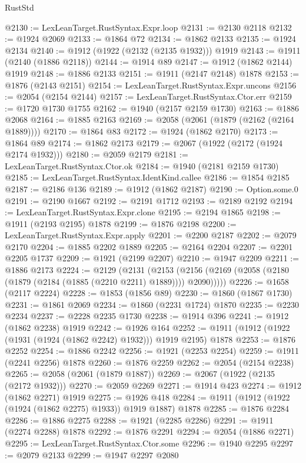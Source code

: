 \begin{lexlean}{RustStd}
\begin{coremodule}
@2130 := LexLeanTarget.RustSyntax.Expr.loop
@2131 := @2130 @2118
@2132 := @1924 @2069
@2133 := @1864 @72
@2134 := @1862 @2133
@2135 := @1924 @2134
@2140 := @1912 (@1922 (@2132 (@2135 @1932))) @1919
@2143 := @1911 (@2140 (@1886 @2118))
@2144 := @1914 @89
@2147 := @1912 (@1862 @2144) @1919
@2148 := @1886 @2133
@2151 := @1911 (@2147 @2148) @1878
@2153 := @1876 (@2143 @2151)
@2154 := LexLeanTarget.RustSyntax.Expr.uncons
@2156 := @2054 (@2154 @2144)
@2157 := LexLeanTarget.RustSyntax.Ctor.err
@2159 := @1720 @1730 @1755
@2162 := @1940 (@2157 @2159 @1730)
@2163 := @1886 @2068
@2164 := @1885 @2163
@2169 := @2058 (@2061 (@1879 (@2162 (@2164 @1889))))
@2170 := @1864 @83
@2172 := @1924 (@1862 @2170)
@2173 := @1864 @89
@2174 := @1862 @2173
@2179 := @2067 (@1922 (@2172 (@1924 @2174 @1932)))
@2180 := @2059 @2179
@2181 := LexLeanTarget.RustSyntax.Ctor.ok
@2184 := @1940 (@2181 @2159 @1730)
@2185 := LexLeanTarget.RustSyntax.IdentKind.callee
@2186 := @1854 @2185
@2187 := @2186 @136
@2189 := @1912 (@1862 @2187)
@2190 := Option.some.{0}
@2191 := @2190 @1667
@2192 := @2191 @1712
@2193 := @2189 @2192
@2194 := LexLeanTarget.RustSyntax.Expr.clone
@2195 := @2194 @1865
@2198 := @1911 (@2193 @2195) @1878
@2199 := @1876 @2198
@2200 := LexLeanTarget.RustSyntax.Expr.apply
@2201 := @2200 @2187
@2202 := @2079 @2170
@2204 := @1885 @2202 @1889
@2205 := @2164 @2204
@2207 := @2201 @2205 @1737
@2209 := @1921 (@2199 @2207)
@2210 := @1947 @2209
@2211 := @1886 @2173
@2224 := @2129
    (@2131
      (@2153 (@2156 (@2169 (@2058 (@2180 (@1879 (@2184 (@1885 (@2210 @2211) @1889)))) @2090)))))
@2226 := @1658 (@2117 @2224)
@2228 := @1853 (@1856 @89)
@2230 := @1860 (@1867 @1730)
@2231 := @1861 @2069
@2234 := @1860 (@2231 @1724) @1870
@2235 := @2230 @2234
@2237 := @2228 @2235 @1730
@2238 := @1914 @396
@2241 := @1912 (@1862 @2238) @1919
@2242 := @1926 @164
@2252 := @1911 (@1912 (@1922 (@1931 (@1924 (@1862 @2242) @1932))) @1919 @2195) @1878
@2253 := @1876 @2252
@2254 := @1886 @2242
@2256 := @1921 (@2253 @2254)
@2259 := @1911 (@2241 @2256) @1878
@2260 := @1876 @2259
@2262 := @2054 (@2154 @2238)
@2265 := @2058 (@2061 (@1879 @1887))
@2269 := @2067 (@1922 (@2135 (@2172 @1932)))
@2270 := @2059 @2269
@2271 := @1914 @423
@2274 := @1912 (@1862 @2271) @1919
@2275 := @1926 @418
@2284 := @1911 (@1912 (@1922 (@1924 (@1862 @2275) @1933)) @1919 @1887) @1878
@2285 := @1876 @2284
@2286 := @1886 @2275
@2288 := @1921 (@2285 @2286)
@2291 := @1911 (@2274 @2288) @1878
@2292 := @1876 @2291
@2294 := @2054 (@1886 @2271)
@2295 := LexLeanTarget.RustSyntax.Ctor.some
@2296 := @1940 @2295
@2297 := @2079 @2133
@2299 := @1947 @2297 @2080

\end{coremodule}
\end{lexlean}
